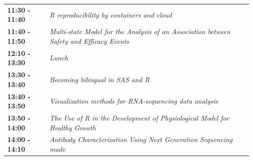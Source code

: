 \documentclass[]{book}
\theoremstyle{definition}
\theoremstyle{definition}
\theoremstyle{definition}
\theoremstyle{remark}
\begin{document}
\begin{longtable}[]{@{}ll@{}}
\begin{minipage}[t]{0.47\columnwidth}
\textbf{11:30 - 11:40}\strut
\end{minipage} & \begin{minipage}[t]{0.47\columnwidth}\raggedright
\emph{R reproducibility by containers and cloud}\strut
\end{minipage}\tabularnewline
\begin{minipage}[t]{0.47\columnwidth}\raggedright
\textbf{11:40 - 11:50}\strut
\end{minipage} & \begin{minipage}[t]{0.47\columnwidth}\raggedright
\emph{Multi-state Model for the Analysis of an Association between
Safety and Efficacy Events}\strut
\end{minipage}\tabularnewline
\begin{minipage}[t]{0.47\columnwidth}\raggedright
\textbf{12:10 - 13:30}\strut
\end{minipage} & \begin{minipage}[t]{0.47\columnwidth}\raggedright
\emph{Lunch}\strut
\end{minipage}\tabularnewline
\begin{minipage}[t]{0.47\columnwidth}\raggedright
\textbf{13:30 - 13:40}\strut
\end{minipage} & \begin{minipage}[t]{0.47\columnwidth}\raggedright
\emph{Becoming bilingual in SAS and R}\strut
\end{minipage}\tabularnewline
\begin{minipage}[t]{0.47\columnwidth}\raggedright
\textbf{13:40 - 13:50}\strut
\end{minipage} & \begin{minipage}[t]{0.47\columnwidth}\raggedright
\emph{Visualization methods for RNA-sequencing data analysis}\strut
\end{minipage}\tabularnewline
\begin{minipage}[t]{0.47\columnwidth}\raggedright
\textbf{13:50 - 14:00}\strut
\end{minipage} & \begin{minipage}[t]{0.47\columnwidth}\raggedright
\emph{The Use of R in the Development of Physiological Model for Healthy
Growth}\strut
\end{minipage}\tabularnewline
\begin{minipage}[t]{0.47\columnwidth}\raggedright
\textbf{14:00 - 14:10}\strut
\end{minipage} & \begin{minipage}[t]{0.47\columnwidth}\raggedright
\emph{Antibody Characterization Using Next Generation Sequencing made
}
\end{minipage}
\end{longtable}
\end{document}
